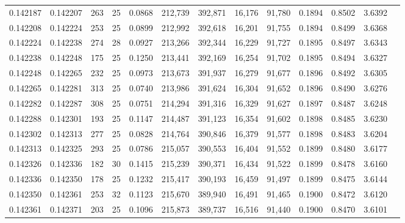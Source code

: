 \begin{tabular}{rrrrrrrrrrrrr}
0.142187 & 0.142207 & 263 &  25 &                                     0.0868 & 212,739 & 392,871 &  16,176 &  91,780 & 0.1894 & 0.8502 & 3.6392 \\
0.142208 & 0.142224 & 253 &  25 &                                     0.0899 & 212,992 & 392,618 &  16,201 &  91,755 & 0.1894 & 0.8499 & 3.6368 \\
0.142224 & 0.142238 & 274 &  28 &                                     0.0927 & 213,266 & 392,344 &  16,229 &  91,727 & 0.1895 & 0.8497 & 3.6343 \\
0.142238 & 0.142248 & 175 &  25 &                                     0.1250 & 213,441 & 392,169 &  16,254 &  91,702 & 0.1895 & 0.8494 & 3.6327 \\
0.142248 & 0.142265 & 232 &  25 &                                     0.0973 & 213,673 & 391,937 &  16,279 &  91,677 & 0.1896 & 0.8492 & 3.6305 \\
0.142265 & 0.142281 & 313 &  25 &                                     0.0740 & 213,986 & 391,624 &  16,304 &  91,652 & 0.1896 & 0.8490 & 3.6276 \\
0.142282 & 0.142287 & 308 &  25 &                                     0.0751 & 214,294 & 391,316 &  16,329 &  91,627 & 0.1897 & 0.8487 & 3.6248 \\
0.142288 & 0.142301 & 193 &  25 &                                     0.1147 & 214,487 & 391,123 &  16,354 &  91,602 & 0.1898 & 0.8485 & 3.6230 \\
0.142302 & 0.142313 & 277 &  25 &                                     0.0828 & 214,764 & 390,846 &  16,379 &  91,577 & 0.1898 & 0.8483 & 3.6204 \\
0.142313 & 0.142325 & 293 &  25 &                                     0.0786 & 215,057 & 390,553 &  16,404 &  91,552 & 0.1899 & 0.8480 & 3.6177 \\
0.142326 & 0.142336 & 182 &  30 &                                     0.1415 & 215,239 & 390,371 &  16,434 &  91,522 & 0.1899 & 0.8478 & 3.6160 \\
0.142336 & 0.142350 & 178 &  25 &                                     0.1232 & 215,417 & 390,193 &  16,459 &  91,497 & 0.1899 & 0.8475 & 3.6144 \\
0.142350 & 0.142361 & 253 &  32 &                                     0.1123 & 215,670 & 389,940 &  16,491 &  91,465 & 0.1900 & 0.8472 & 3.6120 \\
0.142361 & 0.142371 & 203 &  25 &                                     0.1096 & 215,873 & 389,737 &  16,516 &  91,440 & 0.1900 & 0.8470 & 3.6101 \\

\end{tabular}
